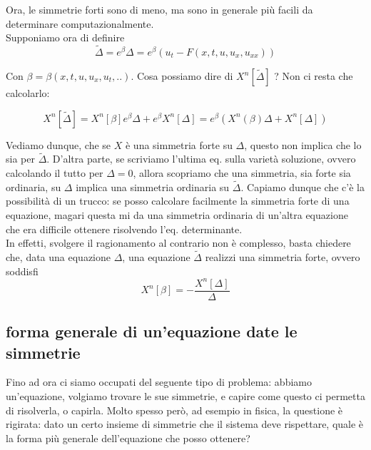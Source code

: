 \documentclass{report}
\begin{document}
Ora, le simmetrie forti sono di meno, ma sono in generale più facili da determinare computazionalmente. \\
Supponiamo ora di definire
\begin{equation}
    \tilde{\Delta} = e^{\beta}\Delta = e^{\beta}(u_t - F(x, t, u, u_x, u_{xx}))
\end{equation}

Con $\beta = \beta(x, t, u, u_x, u_t, ..)$.  Cosa possiamo dire di $X^n[\tilde{\Delta}]$ ? 
Non ci resta che calcolarlo: 

\begin{equation}
    X^{n}[\tilde{\Delta}] = X^n[\beta]e^\beta\Delta + e^\beta X^n[\Delta] = e^\beta(X^n(\beta)\Delta + X^n[\Delta])
\end{equation}

Vediamo dunque, che se $X$ è una simmetria forte su $\Delta$, questo non implica che lo sia per $\tilde{\Delta}$. D'altra parte, se scriviamo l'ultima eq. sulla varietà soluzione, ovvero calcolando il tutto per $\Delta=0$, allora scopriamo che una simmetria, sia forte sia ordinaria, su $\Delta$ implica una simmetria ordinaria su $\tilde{\Delta}$. Capiamo dunque che c'è la possibilità di un trucco: se posso calcolare facilmente la simmetria forte di una equazione, magari questa mi da una simmetria ordinaria di un'altra equazione che era difficile ottenere risolvendo l'eq. determinante. \\

In effetti, svolgere il ragionamento al contrario non è complesso, basta chiedere che, data una equazione $\Delta$, una equazione $\tilde{\Delta}$ realizzi una simmetria forte, ovvero soddisfi 
\begin{equation}
    X^n[\beta] = - \frac{X^ n[\Delta]}{\Delta}
\end{equation}

\subsection{forma generale di un'equazione date le simmetrie}

Fino ad ora ci siamo occupati del seguente tipo di problema: abbiamo un'equazione, volgiamo trovare le sue simmetrie, e capire come questo ci permetta di risolverla, o capirla. Molto spesso però, ad esempio in fisica, la questione è rigirata: dato un certo insieme di simmetrie che il sistema deve rispettare, quale è la forma più generale dell'equazione che posso ottenere? \\
\end{document}
